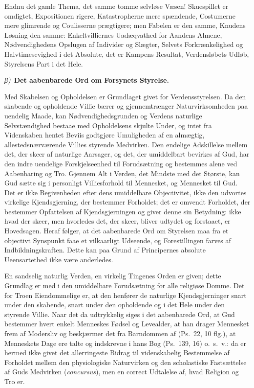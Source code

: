 \documentclass[12pt]{book}
\newcommand{\greekrun}[2]{%
  \medskip\begin{center}{\itshape #1)}\ {\bfseries #2}\end{center}\medskip}
\begin{document}
Endnu det gamle Thema, det samme tomme selvløse Væsen! Skuespillet
er omdigtet, Expositionen rigere, Katastropherne mere spændende,
Costumerne mere glimrende og Coulisserne prægtigere; men Fabelen er
den samme, Knudens Løsning den samme: Enkeltvilliernes
Uadæqvathed for Aandens Almene, Nødvendighedens Opslugen af
Individer og Slægter, Selvets Forkrænkelighed og Halvtimesevighed i
det Absolute, det er Kampens Resultat, Verdensløbets Udløb,
Styrelsens Part i det Hele.

\greekrun{β}{Det aabenbarede Ord om Forsynets Styrelse.}

Med Skabelsen og Opholdelsen er Grundlaget givet for
Verdensstyrelsen. Da den skabende og opholdende Villie bærer og
gjennemtrænger Naturvirksomheden paa uendelig Maade, kan
Nødvendighedsgrunden og Verdens naturlige Selvstændighed bestaae med
Opholdelsens skjulte Under, og intet fra Videnskaben hentet Beviis
godtgjøre Umuligheden af en almægtig, allestedsnærværende Villies
styrende Medvirken. Den endelige Adskillelse mellem det, der skeer
af naturlige Aarsager, og det, der umiddelbart bevirkes af Gud, har
den indre uendelige Forskjelseenhed til Forudsætning og bestemmes
alene ved Aabenbaring og Tro. Gjennem Alt i Verden, det Mindste med
det Største, kan Gud sætte sig i personligt Villiesforhold til
Mennesket, og Mennesket til Gud. Det er ikke Begivenheden efter dens
umiddelbare Objectivitet, ikke den udvortes virkelige
Kjendsgjerning, der bestemmer Forholdet; det er omvendt Forholdet,
der bestemmer Opfattelsen af Kjendsgjerningen og giver denne sin
Betydning: ikke hvad der skeer, men hvorledes det, der skeer, bliver
udtydet og forstaaet, er Hovedsagen. Heraf følger, at det aabenbarede
Ord om Styrelsen maa fra et objectivt Synspunkt faae et vilkaarligt
Udseende, og Forestillingen farves af Indbildningskraften. Dette kan
paa Grund af Principernes absolute Ueensartethed ikke være
anderledes.

En sandselig naturlig Verden, en virkelig Tingenes Orden er given;
dette Grundlag er med i den umiddelbare Forudsætning for alle
religiøse Domme. Det for Troen
Eiendommelige er, at den henfører de naturlige Kjendsgjerninger
snart under den skabende, snart under den opholdende og i det Hele
under den styrende Villie. Naar det da udtrykkelig siges i det
aabenbarede Ord, at Gud bestemmer hvert enkelt Menneskes Fødsel og
Levealder, at han drager Mennesket frem af Modersliv og beskjærmer
det fra Barndommen af (Ps.\ 22, 10 flg.), at Menneskets Dage ere
talte og indskrevne i hans Bog (Ps.\ 139, 16) o.\ s.\ v.: da er
hermed ikke givet det allerringeste Bidrag til videnskabelig
Bestemmelse af Forholdet mellem den physiologiske Naturvirken og den
scholastiske Fastsættelse af Guds Medvirken (\textit{concursus}),
men en correct Udtalelse af, hvad Religion og Tro er.
\end{document}
